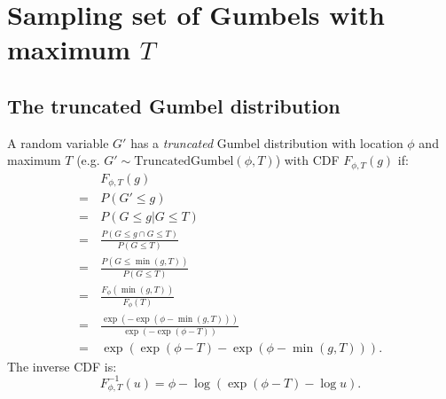 \newpage

\section{Sampling set of Gumbels with maximum $T$}
\label{app:sampling_gumbels_conditional}

\subsection{The truncated Gumbel distribution}
A random variable $G'$ has a \emph{truncated} Gumbel distribution with location $\phi$ and maximum $T$ (e.g. $G' \sim \text{TruncatedGumbel}(\phi, T)$) with CDF $F_{\phi,T}(g)$ if:
\begin{align}
    & \,F_{\phi,T}(g) \nonumber \\
    =& \, P(G' \le g) \nonumber \\
    =& \, P(G \le g | G \le T) \nonumber \\
    =& \, \frac{P(G \le g \cap G \le T)}{P(G \le T)} \nonumber\\
    =& \, \frac{P(G \le \min(g, T))}{P(G \le T)} \nonumber \\
    =& \, \frac{F_\phi(\min(g, T))}{F_\phi(T)} \nonumber\\
    =& \, \frac{\exp (- \exp (\phi - \min(g, T)))}{\exp (- \exp (\phi - T))} \nonumber \\
    =& \, \exp (\exp (\phi - T) - \exp (\phi - \min(g, T))). \label{eq:trunc_gumb_cdf}
\end{align}
The inverse CDF is:
\begin{equation}
\label{eq:trunc_gumb_inv_cdf}
    F^{-1}_{\phi,T}(u) = \phi - \log( \exp( \phi - T ) - \log u ).
\end{equation}

